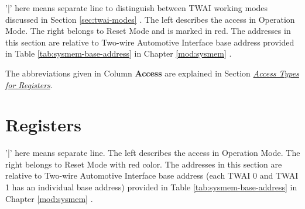 \documentclass[main\_\_EN.tex]{subfiles}
\begin{document}
'|' here means separate line to distinguish between TWAI working modes discussed in Section \ref{sec:twai-modes} \textit{}. The left describes the access in Operation Mode. The right belongs to Reset Mode and is marked in red. The addresses in this section are relative to Two-wire Automotive Interface base address provided in Table \ref{tab:sysmem-base-address} in Chapter \ref{mod:sysmem} \textit{}.

The abbreviations given in Column \textbf{Access} are explained in Section \hyperref[glossary-access-types]{\textit{Access Types for Registers}}.






\clearpage
\section{Registers}

'|' here means separate line. The left describes the access in Operation Mode. The right belongs to Reset Mode with red color. The addresses in this section are relative to Two-wire Automotive Interface base address (each TWAI 0 and TWAI 1 has an individual base address) provided in Table \ref{tab:sysmem-base-address} in Chapter \ref{mod:sysmem} \textit{}.


\end{document}
